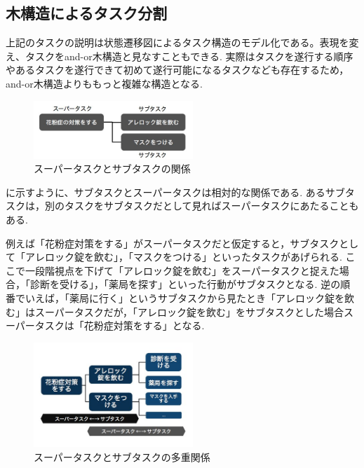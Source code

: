 \documentclass[submit,techreq]{ipsj}
\begin{document}
\subsection{木構造によるタスク分割}
\label{sec: task_tree}

上記のタスクの説明は状態遷移図によるタスク構造のモデル化である。表現を変え、タスクをand-or木構造と見なすこともできる. 実際はタスクを遂行する順序やあるタスクを遂行できて初めて遂行可能になるタスクなども存在するため，and-or木構造よりももっと複雑な構造となる.


\begin{figure}[tb]
\includegraphics[width=6cm, bb=0 0 400 272]{super_sub.jpg}
\caption{スーパータスクとサブタスクの関係}
\label{fig:super_sub}
\end{figure}

に示すように、サブタスクとスーパータスクは相対的な関係である. あるサブタスクは，別のタスクをサブタスクだとして見ればスーパータスクにあたることもある.

例えば「花粉症対策をする」がスーパータスクだと仮定すると，サブタスクとして「アレロック錠を飲む」，「マスクをつける」といったタスクがあげられる. ここで一段階視点を下げて「アレロック錠を飲む」をスーパータスクと捉えた場合，「診断を受ける」，「薬局を探す」といった行動がサブタスクとなる. 逆の順番でいえば，「薬局に行く」というサブタスクから見たとき「アレロック錠を飲む」はスーパータスクだが，「アレロック錠を飲む」をサブタスクとした場合スーパータスクは「花粉症対策をする」となる.

\begin{figure}[tb]
\includegraphics[width=6cm, bb=0 0 350 319]{super_sub_sub.jpg}
\caption{スーパータスクとサブタスクの多重関係}
\label{fig:super_sub_sub}
\end{figure}
\end{document}
